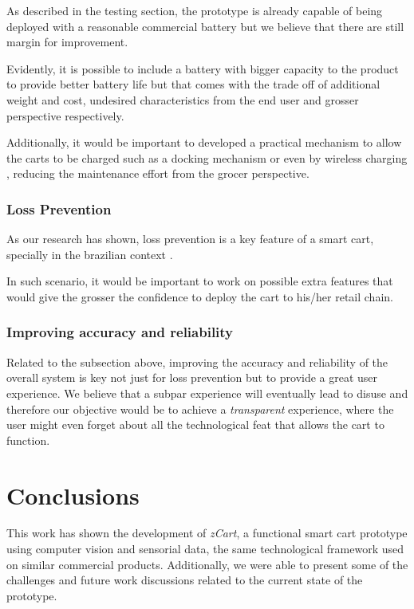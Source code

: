 \documentclass[openright]{normas-utf-tex} %
\begin{document}
As described in the testing section, the prototype is already capable of being
deployed with a reasonable commercial battery but we believe that there are
still margin for improvement.

Evidently, it is possible to include a battery with bigger capacity to the
product to provide better battery life but that comes with the trade off of
additional weight and cost, undesired characteristics from the end user and
grosser perspective respectively.

Additionally, it would be important to developed a practical mechanism to allow
the carts to be charged such as a docking mechanism or even by wireless
charging \cite{Treffers2015}, reducing the maintenance effort from the grocer
perspective. 

\subsection{Loss Prevention}

As our research has shown, loss prevention is a key feature of a smart cart, specially in the brazilian context
\cite{Nextop2022}.

In such scenario, it would be important to work on possible extra features that
would give the grosser the confidence to deploy the cart to his/her retail
chain.

\subsection{Improving accuracy and reliability}

Related to the subsection above, improving the accuracy and reliability of the
overall system is key not just for loss prevention but to provide a great user
experience. We believe that a subpar experience will eventually lead to disuse
and therefore our objective would be to achieve a \textit{transparent}
experience, where the user might even forget about all the technological feat
that allows the cart to function.

\chapter{Conclusions}

This work has shown the development of \textit{zCart}, a functional smart cart
prototype using computer vision and sensorial data, the same technological
framework used on similar commercial products. Additionally, we were able to present
some of the challenges and future work discussions related to the current state
of the prototype.
\end{document}
